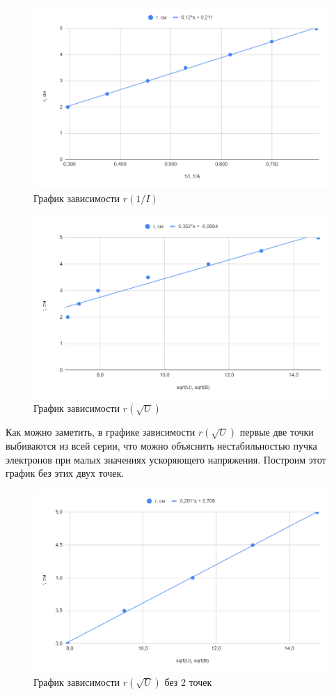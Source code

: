 \documentclass[12pt]{article}
\begin{document}
	\begin{figure}[H]
		\centering
		\includegraphics[width=0.9\linewidth]{graph1}
		\caption{График зависимости $r(1/I)$}
	\end{figure}
	\begin{figure}[H]
		\centering
		\includegraphics[width=0.9\linewidth]{graph2}
		\caption{График зависимости $r(\sqrt{U})$}
	\end{figure}
	Как можно заметить, в графике зависимости $r(\sqrt{U})$ первые две точки выбиваются из всей серии, что можно объяснить нестабильностью пучка электронов при малых значениях ускоряющего напряжения. Построим этот график без этих двух точек.
	\begin{figure}[H]
		\centering
		\includegraphics[width=0.9\linewidth]{graph3}
		\caption{График зависимости $r(\sqrt{U})$ без 2 точек}
	\end{figure}
\end{document}
